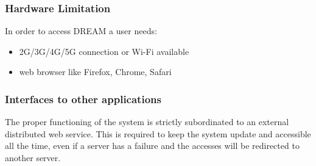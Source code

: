 \subsubsection{Hardware Limitation}
In order to access DREAM a user needs:
\begin{itemize}
    \item 2G/3G/4G/5G connection or Wi-Fi available
    \item web browser like Firefox, Chrome, Safari
\end{itemize}
\subsubsection{Interfaces to other applications}
The proper functioning of the system is strictly subordinated to an external distributed web service. This is required to keep the system update and accessible all the time, even if a server has a failure and the accesses will be redirected to another server.
